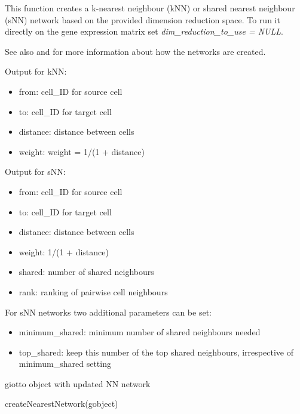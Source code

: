 \documentclass[a4paper]{book}
\begin{document}
%
\begin{Details}\relax
This function creates a k-nearest neighbour (kNN) or shared nearest neighbour (sNN) network
based on the provided dimension reduction space. To run it directly on the gene expression matrix
set \emph{dim\_reduction\_to\_use = NULL}.

See also  and  for more information about
how the networks are created.

Output for kNN:
\begin{itemize}

\item{} from: cell\_ID for source cell
\item{} to: cell\_ID for target cell
\item{} distance: distance between cells
\item{} weight: weight = 1/(1 + distance)

\end{itemize}


Output for sNN:
\begin{itemize}

\item{} from: cell\_ID for source cell
\item{} to: cell\_ID for target cell
\item{} distance: distance between cells
\item{} weight: 1/(1 + distance)
\item{} shared: number of shared neighbours
\item{} rank: ranking of pairwise cell neighbours

\end{itemize}

For sNN networks two additional parameters can be set:
\begin{itemize}

\item{} minimum\_shared: minimum number of shared neighbours needed
\item{} top\_shared: keep this number of the top shared neighbours, irrespective of minimum\_shared setting

\end{itemize}

\end{Details}
%
\begin{Value}
giotto object with updated NN network
\end{Value}
%
\begin{Examples}
\begin{ExampleCode}
    createNearestNetwork(gobject)
\end{ExampleCode}
\end{Examples}
\end{document}

